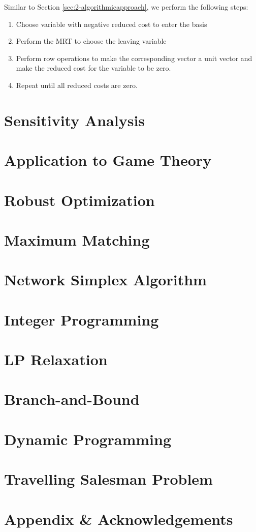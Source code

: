\documentclass{article}
\begin{document}
\noindent Similar to Section \ref{sec:2-algorithmicapproach}, we perform the following steps: \begin{enumerate}
    \item Choose variable with negative reduced cost to enter the basis
    \item Perform the MRT to choose the leaving variable
    \item Perform row operations to make the corresponding vector a unit vector and make the reduced cost for the variable to be zero. 
    \item Repeat until all reduced costs are zero. 
\end{enumerate}



\section{Sensitivity Analysis}

\section{Application to Game Theory}

\section{Robust Optimization}

\section{Maximum Matching}

\section{Network Simplex Algorithm}

\section{Integer Programming}

\section{LP Relaxation}

\section{Branch-and-Bound}


\section{Dynamic Programming}

\section{Travelling Salesman Problem}

\newpage 

\section*{Appendix \& Acknowledgements}
\end{document}
